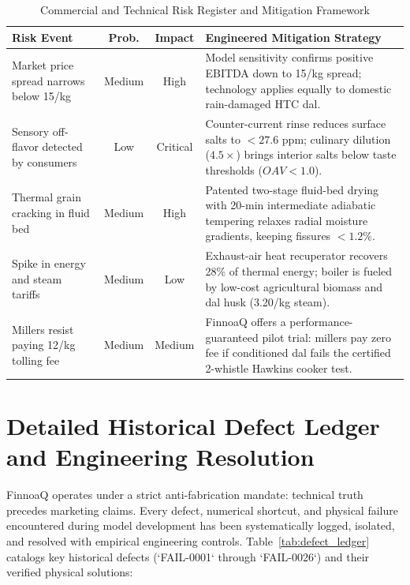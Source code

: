 \documentclass[10pt,a4paper]{article}
\newcommand{\inr}{\text{INR~}}
\begin{document}
\begin{table}[H]
\centering
\small
\caption{Commercial and Technical Risk Register and Mitigation Framework}
\label{tab:risk_matrix}
\begin{tabularx}{\linewidth}{p{2.6cm}ccX}
\toprule
\textbf{Risk Event} & \textbf{Prob.} & \textbf{Impact} & \textbf{Engineered Mitigation Strategy} \\
\midrule
Market price spread narrows below \inr 15/kg & Medium & High & Model sensitivity confirms positive EBITDA down to \inr 15/kg spread; technology applies equally to domestic rain-damaged HTC dal. \\
Sensory off-flavor detected by consumers & Low & Critical & Counter-current rinse reduces surface salts to $< 27.6\text{ ppm}$; culinary dilution ($4.5\times$) brings interior salts below taste thresholds ($OAV < 1.0$). \\
Thermal grain cracking in fluid bed & Medium & High & Patented two-stage fluid-bed drying with 20-min intermediate adiabatic tempering relaxes radial moisture gradients, keeping fissures $< 1.2\%$. \\
Spike in energy and steam tariffs & Medium & Low & Exhaust-air heat recuperator recovers 28\% of thermal energy; boiler is fueled by low-cost agricultural biomass and dal husk (\inr 3.20/kg steam). \\
Millers resist paying \inr 12/kg tolling fee & Medium & Medium & FinnoaQ offers a performance-guaranteed pilot trial: millers pay zero fee if conditioned dal fails the certified 2-whistle Hawkins cooker test. \\
\bottomrule
\end{tabularx}
\end{table}

\section{Detailed Historical Defect Ledger and Engineering Resolution}

FinnoaQ operates under a strict anti-fabrication mandate: technical truth precedes marketing claims. Every defect, numerical shortcut, and physical failure encountered during model development has been systematically logged, isolated, and resolved with empirical engineering controls. Table~\ref{tab:defect_ledger} catalogs key historical defects (`FAIL-0001` through `FAIL-0026`) and their verified physical solutions:
\end{document}
